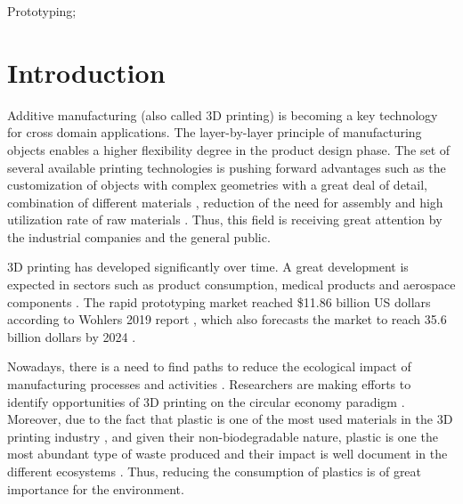 \documentclass[]{interact}
\theoremstyle{plain}%
\theoremstyle{definition}
\theoremstyle{remark}
\begin{document}
\begin{keywords}
Prototyping;
\end{keywords}

\hypertarget{introduction}{%
\section{Introduction}\label{introduction}}

Additive manufacturing (also called 3D printing) is becoming a key
technology for cross domain applications. The layer-by-layer principle
of manufacturing objects enables a higher flexibility degree in the
product design phase. The set of several available printing technologies
is pushing forward advantages such as the customization of objects with
complex geometries with a great deal of detail, combination of different
materials \citep{Askari2020}, reduction of the need for assembly and
high utilization rate of raw materials \citep{Perez2020, Wang2020f}.
Thus, this field is receiving great attention by the industrial
companies and the general public.

3D printing has developed significantly over time. A great development
is expected in sectors such as product consumption, medical products and
aerospace components \citep{Peng2018}. The rapid prototyping market
reached \$11.86 billion US dollars according to Wohlers 2019 report
\citep{Singh2021}, which also forecasts the market to reach 35.6 billion
dollars by 2024 \citep{Forbes2020}.

Nowadays, there is a need to find paths to reduce the ecological impact
of manufacturing processes and activities \citep{Niaki2019}. Researchers
are making efforts to identify opportunities of 3D printing on the
circular economy paradigm \citep{Despeisse2016}. Moreover, due to the
fact that plastic is one of the most used materials in the 3D printing
industry \citep{GonzalezHenriquez2019}, and given their
non-biodegradable nature, plastic is one the most abundant type of waste
produced and their impact is well document in the different ecosystems
\citep{Ryberg2019}. Thus, reducing the consumption of plastics is of
great importance for the environment.
\end{document}
